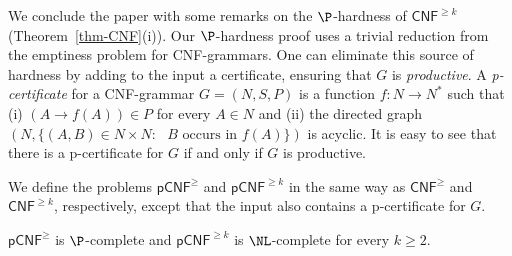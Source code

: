 \documentclass[a4paper,UKenglish,cleveref, autoref, thm-restate, numberwithinsect]{lipics-v2021}
\newcommand{\CNF}{\mathsf{CNF}}
\newcommand{\rCNF}{\mathsf{pCNF}}
\begin{document}
We conclude the paper with some remarks on the 
$\P$-hardness of $\CNF^{\ge k}$ (Theorem~\ref{thm-CNF}(i)). Our $\P$-hardness proof uses
a trivial reduction from the emptiness problem for CNF-grammars.
One can eliminate this source of hardness by adding to the input a certificate, ensuring that $G$ is \emph{productive}. 
A \emph{p-certificate} for a CNF-grammar $G = (N,S,P)$ is a function $f : N \to N^*$ such that
(i) $(A \to f(A)) \in P$ for every $A \in N$ and 
(ii) the directed graph $(N, \{ (A,B) \in N \times N : \text{ $B$ occurs in $f(A)$} \})$ is acyclic. It is easy to see that
there is a p-certificate for $G$ if and only if $G$ is productive.

We define the problems $\rCNF^\ge$ and $\rCNF^{\ge k}$ in the same way as $\CNF^\ge$ and $\CNF^{\ge k}$, respectively, except 
that the input also contains a p-certificate for $G$. 

\begin{theorem} \label{theorem-rCNF-Ptime}
$\rCNF^\ge$ is $\P$-complete and 
$\rCNF^{\ge k}$ is $\NL$-complete for every $k \geq 2$.
\end{theorem}
\end{document}
